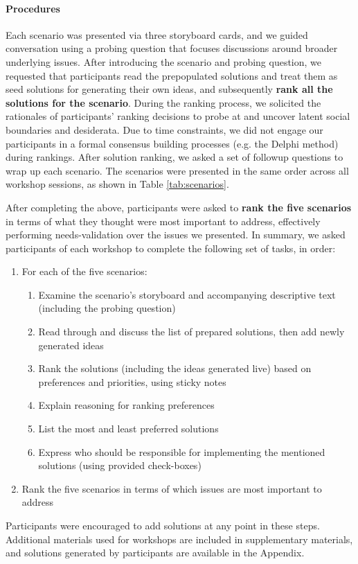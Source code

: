 \paragraph{Procedures}
Each scenario was presented via three storyboard cards, and we guided conversation using a probing question that focuses discussions around broader underlying issues. 
After introducing the scenario and probing question, we requested that participants read the prepopulated solutions and treat them as seed solutions for generating their own ideas, and subsequently \textbf{rank all the solutions for the scenario}. 
During the ranking process, we solicited the rationales of participants' ranking decisions to probe at and uncover latent social boundaries and desiderata. Due to time constraints, we did not engage our participants in a formal consensus building processes (e.g. the Delphi method) during rankings. After solution ranking, we asked a set of followup questions to wrap up each scenario. The scenarios were presented in the same order across all workshop sessions, as shown in Table \ref{tab:scenarios}.

After completing the above, participants were asked to \textbf{rank the five scenarios} in terms of what they thought were most important to address, effectively performing needs-validation over the issues we presented. In summary, we asked participants of each workshop to complete the following set of tasks, in order: 
\begin{enumerate}
    \item {For each of the five scenarios:}
    \begin{enumerate}
        \item {Examine the scenario's storyboard and accompanying descriptive text (including the probing question)}
        \item Read through and discuss the list of prepared solutions, then add newly generated ideas
        \item {Rank the solutions (including the ideas generated live) based on preferences and priorities, using sticky notes}
        \item {Explain reasoning for ranking preferences}
        \item {List the most and least preferred solutions}
        \item {Express who should be responsible for implementing the mentioned solutions (using provided check-boxes)}
    \end{enumerate}
    \item {Rank the five scenarios in terms of which issues are most important to address}
\end{enumerate}
Participants were encouraged to add solutions at any point in these steps. Additional materials used for workshops are included in supplementary materials, and solutions generated by participants are available in the Appendix. 

